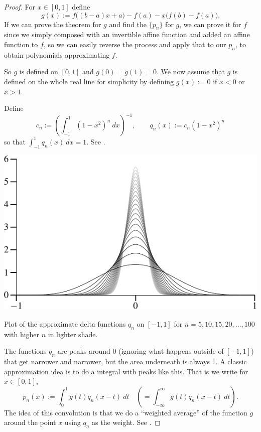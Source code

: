 \begin{proof}
For $x \in [0,1]$ define
\begin{equation*}
g(x) := f\bigl((b-a)x+a\bigr)-f(a) - x\bigl(f(b)-f(a)\bigr) .
\end{equation*}
If we can prove the theorem for $g$ and find the $\{ p_n \}$ for $g$,
we can prove it for $f$ since we simply
composed with an invertible affine function and added an affine
function to $f$, so we can easily reverse the process and apply that to our
$p_n$, to obtain polynomials approximating $f$.

So $g$ is defined on $[0,1]$ and $g(0)=g(1)=0$.  We now assume that
$g$ is defined on the whole real line for simplicity by defining
$g(x) := 0$ if $x < 0$ or $x > 1$.

Define
\begin{equation*}
c_n := {\left( \int_{-1}^1 {(1-x^2)}^n~dx \right)}^{-1} ,
\qquad
q_n(x) := c_n (1-x^2)^n
\end{equation*}
so that $\int_{-1}^1 q_n(x)~dx = 1$.
See .

\begin{myfigureht}
\includegraphics{figures/weierqn}
\caption{Plot of the approximate delta functions $q_n$ on $[-1,1]$ for
$n=5,10,15,20,\ldots,100$ with higher $n$ in lighter shade.\label{fig:weierqn}}
\end{myfigureht}

The functions $q_n$ are peaks around 0 (ignoring what happens outside
of $[-1,1]$) that get narrower and narrower, but the area underneath is
always 1.
A classic approximation idea
is to do a \emph{} integral with peaks like this.
That is we 
write for $x \in [0,1]$,
\begin{equation*}
p_n(x) := \int_{0}^1 g(t)q_n(x-t) ~dt \quad \left( = \int_{-\infty}^\infty
g(t)q_n(x-t) ~dt \right) .
\end{equation*}
The idea of this convolution is that we do a ``weighted average'' of the
function $g$ around the point $x$ using $q_n$ as the weight.
See .


\end{proof}
